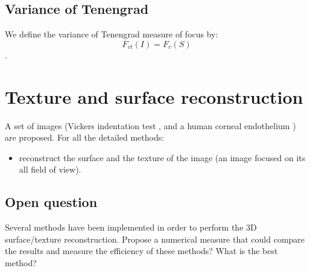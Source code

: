 \subsection{Variance of Tenengrad}
 We define the variance of Tenengrad measure of focus by:
$$F_{vt}(I)=F_v(S)$$.

\section{Texture and surface reconstruction}
\begin{qbox}
A set of images (Vickers indentation test \cite{Fernandes2010}, and a human corneal endothelium \cite{Fernandes2012}) are proposed.
For all the detailed methods:
\begin{itemize}
 \item reconstruct the surface and the texture of the image (an image focused on its all field of view).

\end{itemize}

\end{qbox}

\subsection{Open question}
\begin{qbox}
Several methods have been implemented in order to perform the 3D surface/texture reconstruction. Propose a numerical measure that could compare the results and measure the efficiency of these methods? What is the best method?
\end{qbox}


